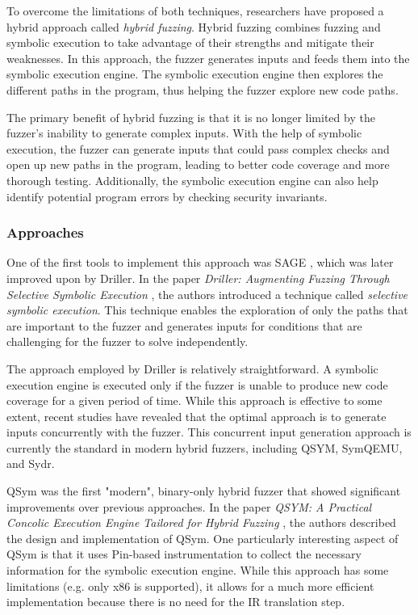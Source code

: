 To overcome the limitations of both techniques, researchers have proposed a hybrid approach called \textit{hybrid fuzzing}. Hybrid fuzzing combines fuzzing and symbolic execution to take advantage of their strengths and mitigate their weaknesses. In this approach, the fuzzer generates inputs and feeds them into the symbolic execution engine. The symbolic execution engine then explores the different paths in the program, thus helping the fuzzer explore new code paths.

The primary benefit of hybrid fuzzing is that it is no longer limited by the fuzzer's inability to generate complex inputs. With the help of symbolic execution, the fuzzer can generate inputs that could pass complex checks and open up new paths in the program, leading to better code coverage and more thorough testing. Additionally, the symbolic execution engine can also help identify potential program errors by checking security invariants.

\subsubsection{Approaches}

One of the first tools to implement this approach was SAGE \cite{sage-acm-2012}, which was later improved upon by Driller. In the paper \textit{Driller: Augmenting Fuzzing Through Selective Symbolic Execution} \cite{driller-ndss16}, the authors introduced a technique called \textit{selective symbolic execution}. This technique enables the exploration of only the paths that are important to the fuzzer and generates inputs for conditions that are challenging for the fuzzer to solve independently.

The approach employed by Driller is relatively straightforward. A symbolic execution engine is executed only if the fuzzer is unable to produce new code coverage for a given period of time. While this approach is effective to some extent, recent studies have revealed that the optimal approach is to generate inputs concurrently with the fuzzer. This concurrent input generation approach is currently the standard in modern hybrid fuzzers, including QSYM, SymQEMU, and Sydr.


QSym was the first "modern", binary-only hybrid fuzzer that showed significant improvements over previous approaches. In the paper \textit{QSYM: A Practical Concolic Execution Engine Tailored for Hybrid Fuzzing} \cite{qsym-usenix2018}, the authors described the design and implementation of QSym. One particularly interesting aspect of QSym is that it uses Pin-based instrumentation to collect the necessary information for the symbolic execution engine. While this approach has some limitations (e.g. only x86 is supported), it allows for a much more efficient implementation because there is no need for the IR translation step.

